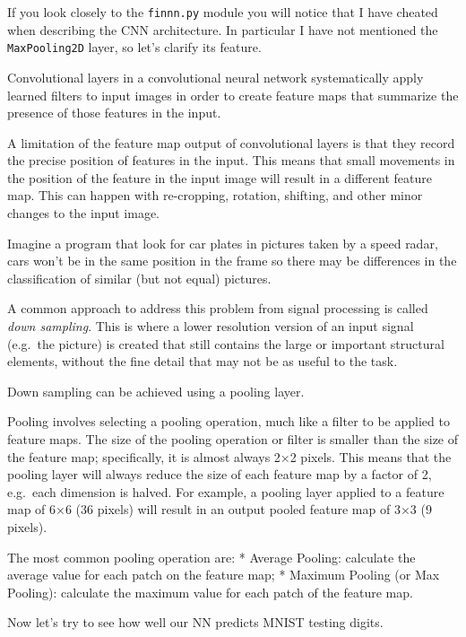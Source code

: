 If you look closely to the \texttt{finnn.py} module you will notice that
I have cheated when describing the CNN architecture. In particular I
have not mentioned the \texttt{MaxPooling2D} layer, so let's clarify its
feature.

Convolutional layers in a convolutional neural network systematically
apply learned filters to input images in order to create feature maps
that summarize the presence of those features in the input.

A limitation of the feature map output of convolutional layers is that
they record the precise position of features in the input. This means
that small movements in the position of the feature in the input image
will result in a different feature map. This can happen with
re-cropping, rotation, shifting, and other minor changes to the input
image.

Imagine a program that look for car plates in pictures taken by a speed
radar, cars won't be in the same position in the frame so there may be
differences in the classification of similar (but not equal) pictures.

A common approach to address this problem from signal processing is
called \emph{down sampling}. This is where a lower resolution version of
an input signal (e.g.~the picture) is created that still contains the
large or important structural elements, without the fine detail that may
not be as useful to the task.

Down sampling can be achieved using a pooling layer.

Pooling involves selecting a pooling operation, much like a filter to be
applied to feature maps. The size of the pooling operation or filter is
smaller than the size of the feature map; specifically, it is almost
always 2×2 pixels. This means that the pooling layer will always reduce
the size of each feature map by a factor of 2, e.g.~each dimension is
halved. For example, a pooling layer applied to a feature map of 6×6 (36
pixels) will result in an output pooled feature map of 3×3 (9 pixels).

The most common pooling operation are: * Average Pooling: calculate the
average value for each patch on the feature map; * Maximum Pooling (or
Max Pooling): calculate the maximum value for each patch of the feature
map.

Now let's try to see how well our NN predicts MNIST testing digits.


